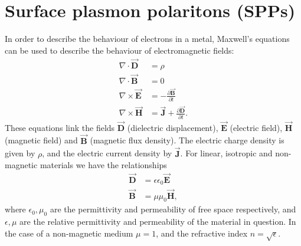 \section{Surface plasmon polaritons (SPPs)}
In order to describe the behaviour of electrons in a metal, Maxwell's equations can be used to describe the behaviour of electromagnetic fields:
\begin{subequations}
\label{Maxwell}
\begin{align}
\nabla \cdot \vec{\mathbf{D}} &= \rho \label{Maxwell1}\\
\nabla \cdot \vec{\mathbf{B}} &= 0 \label{Maxwell2}\\
\nabla \times \vec{\mathbf{E}} &= - \frac{\partial \vec{\mathbf{B}}}{\partial t} \label{Maxwell3}\\
\nabla \times \vec{\mathbf{H}} &= \vec{\mathbf{J}} + \frac{\partial \vec{\mathbf{D}}}{\partial t} \label{Maxwell4}. 
\end{align}
\end{subequations}
These equations link the fields $\vec{\mathbf{D}}$ (dielectric displacement), $\vec{\mathbf{E}}$ (electric field), $\vec{\mathbf{H}}$ (magnetic field) and $\vec{\mathbf{B}}$ (magnetic flux density). The electric charge density is given by $\rho$, and the electric current density by $\vec{\mathbf{J}}$. For linear, isotropic and non-magnetic materials we have the relationships
\begin{subequations}
\label{fieldrelations}
\begin{align}
\vec{\mathbf{D}} &= \epsilon \epsilon_0 \vec{\mathbf{E}} \label{DE}\\
\vec{\mathbf{B}} &= \mu \mu_0 \vec{\mathbf{H}} \label{BH},
\end{align}
\end{subequations}
where $\epsilon_0, \mu_0$ are the permittivity and permeability of free space respectively, and $\epsilon, \mu$ are the relative permittivity and permeability of the material in question. In the case of a non-magnetic medium $\mu=1$, and the refractive index $n=\sqrt{\epsilon}$.

